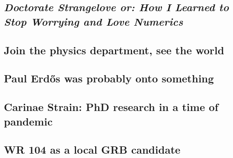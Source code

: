 \subsection[\textit{How I Learned to Stop Worrying and Love Numerics}]{\textit{Doctorate Strangelove or: How I Learned to Stop Worrying and Love Numerics}} 

\subsection{Join the physics department, see the world}

\subsection{Paul Erd\H{o}s was probably onto something}

\subsection{Carinae Strain: PhD research in a time of pandemic}

\subsection{WR 104 as a local GRB candidate}
